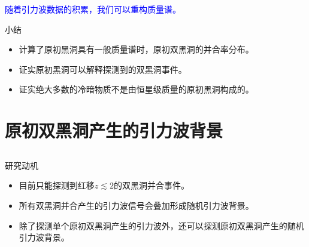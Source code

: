 \documentclass[xcolor={svgnames},compress]{beamer}
\let\olditem\item
\renewcommand{\item}{%
    \olditem\vspace{\fill}}
\begin{document}
\begin{frame}
\begin{columns}
\begin{column}{0.56\textwidth}
\begin{figure}[htbp!]
            \end{figure}
            \vspace{-3mm}
            \centering
        \end{column}
    \end{columns}
\vspace{1mm}

\textcolor{blue}{随着引力波数据的积累，我们可以重构质量谱。}
\end{frame}

\begin{frame}{小结}	
    \begin{itemize}        
        \item 计算了原初黑洞具有一般质量谱时，原初双黑洞的并合率分布。
        \item 证实原初黑洞可以解释\lvc 探测到的双黑洞事件。
        \item 证实绝大多数的冷暗物质不是由恒星级质量的原初黑洞构成的。
    \end{itemize}
\end{frame}


\section{原初双黑洞产生的引力波背景}
\subsection{}
\begin{frame}{研究动机}
    \begin{itemize}
        \item \lvc 目前只能探测到红移$z\lesssim 2$的双黑洞并合事件。
        \item 所有双黑洞并合产生的引力波信号会叠加形成随机引力波背景。
        \item 除了探测单个原初双黑洞产生的引力波外，还可以探测原初双黑洞产生的随机引力波背景。
    \end{itemize}
\end{frame}
\end{document}
